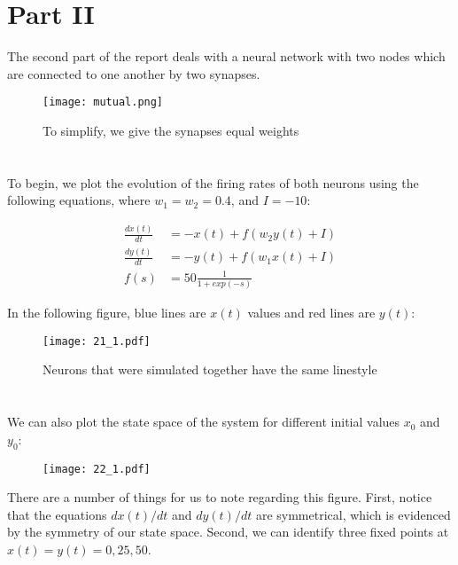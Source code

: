 \documentclass{article}
\begin{document}
\setcounter{section}{0}
\renewcommand{\thesection}{2.\arabic{section}}
\section*{Part II}
The second part of the report deals with a neural network with two nodes which are connected to one another by two synapses.

\begin{figure}[ht]
    \centering
    \texttt{[image: mutual.png]}
    \caption{To simplify, we give the synapses equal weights}
\end{figure}
\vspace{-1em}



\section{}
To begin, we plot the evolution of the firing rates of both neurons using the following equations, where $w_1 = w_2 = 0.4$, and $I = -10$:

\begin{align}
    \frac{dx(t)}{dt} &= -x(t) + f (w_2y(t) + I) \\[1em]
    \frac{dy(t)}{dt} &= -y(t) + f (w_1x(t) + I) \\[1em]
    f(s) &= 50 \frac{1}{1 + exp(-s)}
\end{align}
\vspace{.1em}

In the following figure, blue lines are $x(t)$ values and red lines are $y(t)$:

\begin{figure}[ht]
    \centering
    \texttt{[image: 21\_1.pdf]}
    \caption{Neurons that were simulated together have the same linestyle}
\end{figure}



\FloatBarrier
\section{}
We can also plot the state space of the system for different initial values $x_0$ and $y_0$: 

\begin{figure}[ht]
    \centering
    \texttt{[image: 22\_1.pdf]}
\end{figure}

There are a number of things for us to note regarding this figure. First, notice that the equations $dx(t)/dt$ and $dy(t)/dt$ are symmetrical, which is evidenced by the symmetry of our state space. Second, we can identify three fixed points at $x(t) = y(t) = 0, 25, 50$.
\vspace{1em}
\end{document}
